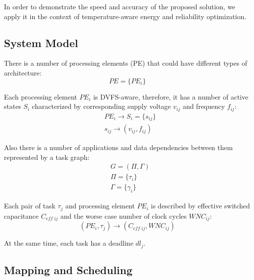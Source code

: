 In order to demonstrate the speed and accuracy of the proposed solution, we apply it in the context of temperature-aware energy and reliability optimization.



\subsection{System Model}
There is a number of processing elements (PE) that could have different types of architecture:
\[
  PE = \{ PE_i \}
\]


Each processing element $PE_i$ is DVFS-aware, therefore, it has a number of active states $S_i$ characterized by corresponding supply voltage $v_{ij}$ and frequency $f_{ij}$:
\begin{align*}
  & PE_i \rightarrow S_i = \{ s_{ij} \} \\
  & s_{ij} \rightarrow (v_{ij}, f_{ij})
\end{align*}

Also there is a number of applications and data dependencies between them represented by a task graph:
\begin{align*}
  & G = (\Pi, \Gamma) \\
  & \Pi = \{\tau_i\} \\
  & \Gamma = \{\gamma_i\}
\end{align*}

Each pair of task $\tau_j$ and processing element $PE_i$ is described by effective switched capacitance $C_{eff \; ij}$ and the worse case number of clock cycles $WNC_{ij}$:
\[
  (PE_i, \tau_j) \rightarrow (C_{eff \; ij}, WNC_{ij})
\]

At the same time, each task has a deadline $dl_j$.

\subsection{Mapping and Scheduling}

